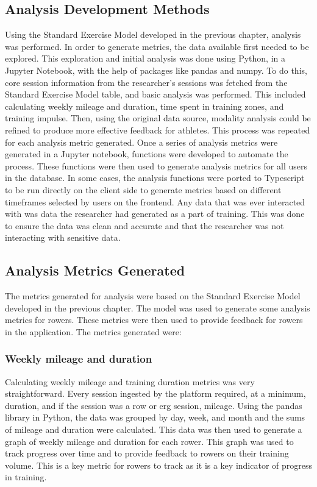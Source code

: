 \subsection{Analysis Development Methods}
Using the Standard Exercise Model developed in the previous chapter, analysis was performed. In order to generate metrics, the data available first needed to be explored. This exploration and initial analysis was done using Python, in a Jupyter Notebook, with the help of packages like pandas and numpy. To do this, core session information from the researcher's sessions was fetched from the Standard Exercise Model table, and basic analysis was performed. This included calculating weekly mileage and duration, time spent in training zones, and training impulse. Then, using the original data source, modality analysis could be refined to produce more effective feedback for athletes. This process was repeated for each analysis metric generated. Once a series of analysis metrics were generated in a Jupyter notebook, functions were developed to automate the process. These functions were then used to generate analysis metrics for all users in the database. In some cases, the analysis functions were ported to Typescript to be run directly on the client side to generate metrics based on different timeframes selected by users on the frontend. Any data that was ever interacted with was data the researcher had generated as a part of training. This was done to ensure the data was clean and accurate and that the researcher was not interacting with sensitive data.

\subsection{Analysis Metrics Generated}
The metrics generated for analysis were based on the Standard Exercise Model developed in the previous chapter. The model was used to generate some analysis metrics for rowers. These metrics were then used to provide feedback for rowers in the application. The metrics generated were:
\subsubsection{Weekly mileage and duration}
Calculating weekly mileage and training duration metrics was very straightforward. Every session ingested by the platform required, at a minimum, duration, and if the session was a row or erg session, mileage. Using the pandas library in Python, the data was grouped by day, week, and month and the sums of mileage and duration were calculated. 
This data was then used to generate a graph of weekly mileage and duration for each rower. This graph was used to track progress over time and to provide feedback to rowers on their training volume. This is a key metric for rowers to track as it is a key indicator of progress in training.
